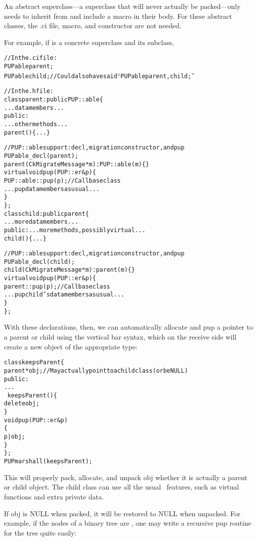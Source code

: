 An abstract superclass---a superclass that will never actually be 
packed---only needs to inherit from  and include a 
 macro in their body.  For
these abstract classes, the 
.ci file,  macro, and constructor are not needed.

For example, if  is a concrete superclass and  its
subclass,

\begin{alltt}
//In the .ci file:
   PUPable parent;
   PUPable child; //Could also have said ``PUPable parent, child;''

//In the .h file:
class parent : public PUP::able \{
    ... data members ...
public:
    ... other methods ...
    parent() \{...\}
    
    //PUP::able support: decl, migration constructor, and pup
    PUPable\_decl(parent);  
    parent(CkMigrateMessage *m) : PUP::able(m) \{\}
    virtual void pup(PUP::er &p) \{
        PUP::able::pup(p);//Call base class
        ... pup data members as usual ...
    \}  
\};
class child : public parent \{
    ... more data members ...
public:    ... more methods, possibly virtual ...
    child() \{...\}
    
    //PUP::able support: decl, migration constructor, and pup
    PUPable\_decl(child);  
    child(CkMigrateMessage *m) : parent(m) \{\}
    virtual void pup(PUP::er &p) \{
        parent::pup(p);//Call base class
        ... pup child's data members as usual ...
    \}  
\};

\end{alltt}

With these declarations, then, we can automatically 
allocate and pup a pointer to a parent or child
using the vertical bar  syntax, which on the receive
side will create a new object of the appropriate type:

\begin{alltt}
class keepsParent \{
    parent *obj; //May actually point to a child class (or be NULL)
public:
    ...
    ~keepsParent() \{
        delete obj;
    \}
    void pup(PUP::er &p) 
    \{
        p|obj;
    \}
\};
PUPmarshall(keepsParent);
\end{alltt}

This will properly pack, allocate, and unpack obj whether
it is actually a parent or child object.  The child class 
can use all the usual \CC\ features, such as virtual functions
and extra private data.

If obj is NULL when packed, it will be restored to NULL when unpacked.
For example, if the nodes of a binary tree are ,
one may write a recursive pup routine for the tree quite easily:

